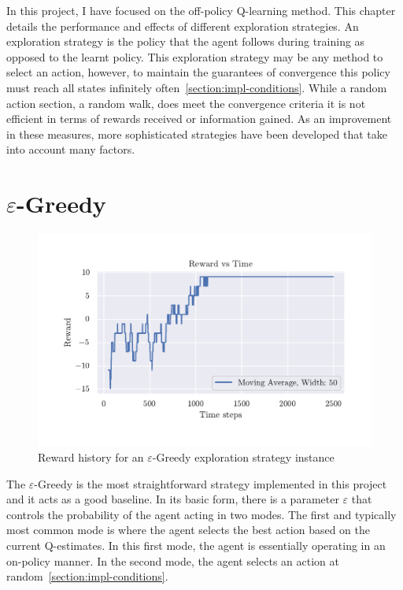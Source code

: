 \documentclass[]{final_report}
\begin{document}
In this project, I have focused on the off-policy Q-learning method. This chapter details the performance and effects of different exploration strategies. An exploration strategy is the policy that the agent follows during training as opposed to the learnt policy. This exploration strategy may be any method to select an action, however, to maintain the guarantees of convergence this policy must reach all states infinitely often~\ref{section:impl-conditions}. While a random action section, a random walk, does meet the convergence criteria it is not efficient in terms of rewards received or information gained. As an improvement in these measures, more sophisticated strategies have been developed that take into account many factors.

\newpage
\section{\texorpdfstring{$\varepsilon$}{Lg}-Greedy}

\begin{figure}[H]
  \centering
  
  \includegraphics[trim={0 1cm 0 1cm},clip,width=\textwidth]{reward-history/EG.pdf}
  
  \caption{\label{fig:reward-history:eg} Reward history for an $\varepsilon$-Greedy exploration strategy instance}
\end{figure}


The $\varepsilon$-Greedy is the most straightforward strategy implemented in this project and it acts as a good baseline. In its basic form, there is a parameter $\varepsilon$ that controls the probability of the agent acting in two modes. The first and typically most common mode is where the agent selects the best action based on the current Q-estimates. In this first mode, the agent is essentially operating in an on-policy manner. In the second mode, the agent selects an action at random~\ref{section:impl-conditions}.
\end{document}
